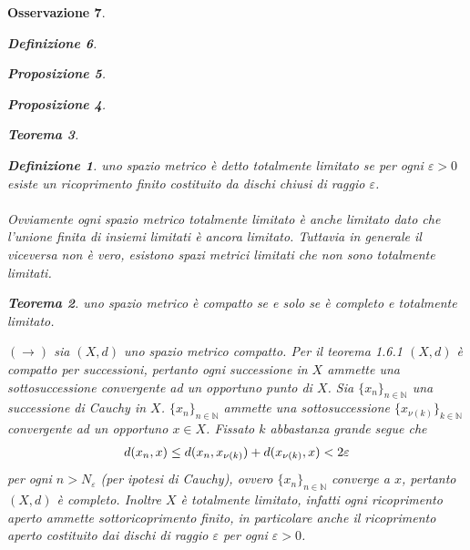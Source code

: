 \documentclass[oneside, 11pt]{amsbook}
\makeatletter
\newcommand{\0}{{(0)}}
\newcommand{\3}{{(3)}}
\theoremstyle{colonplain}
\newtheorem{thm}{Teorema}[chapter]
\newtheorem{prop}[thm]{Proposizione}
\theoremstyle{colondefinition}
\newtheorem{defn}[thm]{Definizione}
\theoremstyle{colonremark}
\newtheorem{rmk}[thm]{Osservazione}
\numberwithin{equation}{chapter}
\renewcommand{\proofname}{Dimostrazione}
\renewenvironment{proof}[1][\proofname]{\par
  \pushQED{\end{proof}}%
  \normalfont \topsep6\p@\@plus6\p@\relax
  \trivlist
  \item[\hskip\labelsep\bfseries #1:]\ignorespaces
}{%
  \popQED\endtrivlist\@endpefalse
}
\makeatother
\begin{document}
\begin{rmk}
\begin{defn}
\begin{prop}
\begin{prop}
\begin{thm}
\begin{defn}
uno spazio metrico è detto \textit{totalmente limitato} se per ogni $\varepsilon > 0$ esiste un ricoprimento finito costituito da dischi chiusi di raggio $\varepsilon$. \\ \\
Ovviamente ogni spazio metrico totalmente limitato è anche limitato dato che l'unione finita di insiemi limitati è ancora limitato. Tuttavia in generale il viceversa non è vero, esistono spazi metrici limitati che non sono totalmente limitati.
\end{defn}
\begin{thm}
uno spazio metrico è compatto se e solo se è completo e totalmente limitato.
\end{thm}
\begin{proof}
$(\rightarrow)$ sia $(X, d)$ uno spazio metrico compatto. Per il \textit{teorema 1.6.1} $(X, d)$ è compatto per successioni, pertanto ogni successione in $X$ ammette una sottosuccessione convergente ad un opportuno punto di $X$. Sia $\{x_n\}_{n \in \mathbb{N}}$ una successione di Cauchy in $X$. $\{x_n\}_{n \in \mathbb{N}}$ ammette una sottosuccessione $\{x_{\nu(k)}\}_{k \in \mathbb{N}}$ convergente ad un opportuno $x \in X$. Fissato $k$ abbastanza grande segue che 
\begin{align}
    d(x_n, x) \leq d(x_n, x_{\nu(k)}) + d(x_{\nu(k)}, x) < 2\varepsilon \notag
\end{align}
per ogni $n > N_\varepsilon$ (per ipotesi di Cauchy), ovvero $\{x_n\}_{n \in \mathbb{N}}$ converge a $x$, pertanto $(X, d)$ è completo. Inoltre $X$ è totalmente limitato, infatti ogni ricoprimento aperto ammette sottoricoprimento finito, in particolare anche il ricoprimento aperto costituito dai dischi di raggio $\varepsilon$ per ogni $\varepsilon > 0$. \\ \\

\end{proof}
\end{thm}
\end{prop}
\end{prop}
\end{defn}
\end{rmk}
\end{document}
